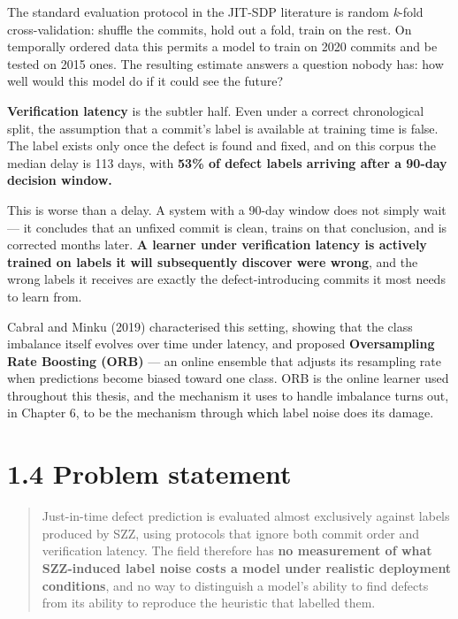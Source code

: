 The standard evaluation protocol in the JIT-SDP literature is random
\emph{k}-fold cross-validation: shuffle the commits, hold out a fold,
train on the rest. On temporally ordered data this permits a model to
train on 2020 commits and be tested on 2015 ones. The resulting estimate
answers a question nobody has: how well would this model do if it could
see the future?

\textbf{Verification latency} is the subtler half. Even under a correct
chronological split, the assumption that a commit's label is available
at training time is false. The label exists only once the defect is
found and fixed, and on this corpus the median delay is 113 days, with
\textbf{53\% of defect labels arriving after a 90-day decision window.}

This is worse than a delay. A system with a 90-day window does not
simply wait --- it concludes that an unfixed commit is clean, trains on
that conclusion, and is corrected months later. \textbf{A learner under
verification latency is actively trained on labels it will subsequently
discover were wrong}, and the wrong labels it receives are exactly the
defect-introducing commits it most needs to learn from.

Cabral and Minku (2019) characterised this setting, showing that the
class imbalance itself evolves over time under latency, and proposed
\textbf{Oversampling Rate Boosting (ORB)} --- an online ensemble that
adjusts its resampling rate when predictions become biased toward one
class. ORB is the online learner used throughout this thesis, and the
mechanism it uses to handle imbalance turns out, in Chapter 6, to be the
mechanism through which label noise does its damage.

\section{1.4 Problem statement}\label{problem-statement}

\begin{quote}
Just-in-time defect prediction is evaluated almost exclusively against
labels produced by SZZ, using protocols that ignore both commit order
and verification latency. The field therefore has \textbf{no measurement
of what SZZ-induced label noise costs a model under realistic deployment
conditions}, and no way to distinguish a model's ability to find defects
from its ability to reproduce the heuristic that labelled them.
\end{quote}

